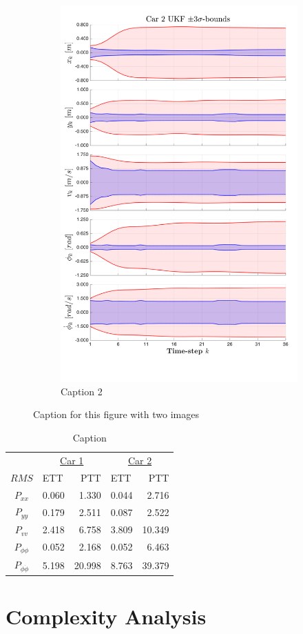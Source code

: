 \begin{figure}[ht]
\begin{subfigure}{0.48\textwidth}
    \includegraphics[width=0.9\linewidth]{include/images/car2.png}
    \caption{Caption 2}
    \label{fig:subim2}
    \end{subfigure}
     
    \caption{Caption for this figure with two images}
    \label{fig:image2}
\end{figure}

\begin{table}[ht]
    \centering
        \begin{tabular}{c|lr|lr}
            \multicolumn{1}{c}{} & \multicolumn{2}{c}{\underline{Car 1}} & \multicolumn{2}{c}{\underline{Car 2}} \\ [1mm]
            $RMS$ & ETT & PTT & ETT & PTT \\ [0.5mm]
            \hline
            $P_{xx}$                   & 0.060 &  1.330 & 0.044 &  2.716 \\ [0.25mm]
            $P_{yy}$                   & 0.179 &  2.511 & 0.087 &  2.522 \\ [0.25mm]
            $P_{vv}$                   & 2.418 &  6.758 & 3.809 & 10.349 \\ [0.25mm]
            $P_{\phi\phi}$             & 0.052 &  2.168 & 0.052 &  6.463 \\ [0.25mm]
            $P_{\dot{\phi}\dot{\phi}}$ & 5.198 & 20.998 & 8.763 & 39.379
        \end{tabular}
    \caption{Caption}
    \label{tab:my_label}
\end{table}



\section{Complexity Analysis}